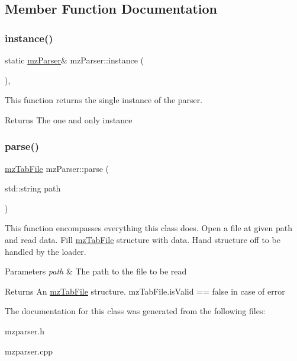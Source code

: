 \subsection{Member Function Documentation}
\mbox{\label{classmz_parser_a8838850b084cdc867b2b03122de5401b}} 
\subsubsection{\texorpdfstring{instance()}{instance()}}
{\footnotesize\ttfamily static \mbox{\hyperlink{classmz_parser}{mz\+Parser}}\& mz\+Parser\+::instance (\begin{DoxyParamCaption}{ }\end{DoxyParamCaption})\hspace{0.3cm}{\ttfamily [inline]}, {\ttfamily [static]}}



This function returns the single instance of the parser. 

\begin{DoxyReturn}{Returns}
The one and only instance 
\end{DoxyReturn}
\mbox{\label{classmz_parser_aaff07e834a579526b82e86a7bd026d1f}} 
\subsubsection{\texorpdfstring{parse()}{parse()}}
{\footnotesize\ttfamily \mbox{\hyperlink{structmz_tab_file}{mz\+Tab\+File}} mz\+Parser\+::parse (\begin{DoxyParamCaption}\item[{std\+::string}]{path }\end{DoxyParamCaption})}



This function encompasses everything this class does. Open a file at given path and read data. Fill \mbox{\hyperlink{structmz_tab_file}{mz\+Tab\+File}} structure with data. Hand structure off to be handled by the loader. 


\begin{DoxyParams}{Parameters}
{\em path} & The path to the file to be read \\
\hline
\end{DoxyParams}
\begin{DoxyReturn}{Returns}
An \mbox{\hyperlink{structmz_tab_file}{mz\+Tab\+File}} structure. mz\+Tab\+File.\+is\+Valid == false in case of error 
\end{DoxyReturn}


The documentation for this class was generated from the following files\+:\begin{DoxyCompactItemize}
\item 
mzparser.\+h\item 
mzparser.\+cpp\end{DoxyCompactItemize}
